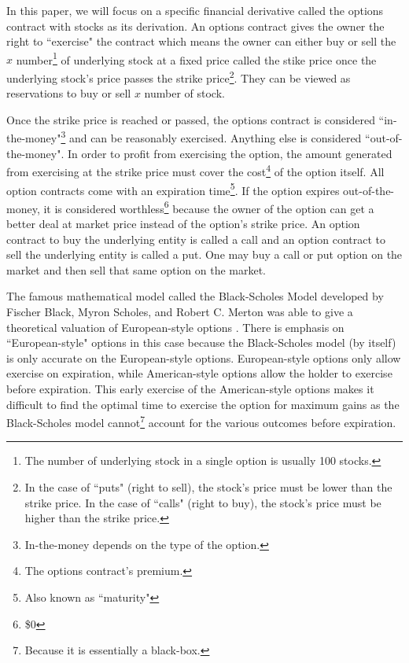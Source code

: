 \documentclass[12pt, letterpaper]{article}\usepackage{float}
\begin{document}
\medskip

In this paper, we will focus on a specific financial derivative called the options contract with stocks as its derivation.
An options contract gives the owner the right to ``exercise" the contract which means the owner can either buy or sell the ${x}$ number\footnote{The number of underlying stock in a single option is usually 100 stocks.} of underlying stock at a fixed price called the stike price once the underlying stock's price passes the strike price\footnote{In the case of ``puts" (right to sell), the stock's price must be lower than the strike price. In the case of ``calls" (right to buy), the stock's price must be higher than the strike price.\label{option rules}}.
They can be viewed as reservations to buy or sell ${x}$ number of stock.

\medskip

Once the strike price is reached or passed, the options contract is considered ``in-the-money"\footnote{In-the-money depends on the type of the option.} and can be reasonably exercised.
Anything else is considered ``out-of-the-money".
In order to profit from exercising the option, the amount generated from exercising at the strike price must cover the cost\footnote{The options contract's premium.} of the option itself.
All option contracts come with an expiration time\footnote{Also known as ``maturity"}.
If the option expires out-of-the-money, it is considered worthless\footnote{\$0} because the owner of the option can get a better deal at market price instead of the option's strike price.
An option contract to buy the underlying entity is called a call and an option contract to sell the underlying entity is called a put.
One may buy a call or put option on the market and then sell that same option on the market.

\medskip

The famous mathematical model called the Black-Scholes Model developed by Fischer Black, Myron Scholes, and Robert C. Merton was able to give a theoretical valuation of European-style options \cite{blackscholesmodelwikipedia}.
There is emphasis on ``European-style" options in this case because the Black-Scholes model (by itself) is only accurate on the European-style options.
European-style options only allow exercise on expiration, while American-style options allow the holder to exercise before expiration.
This early exercise of the American-style options makes it difficult to find the optimal time to exercise the option for maximum gains \cite{blackscholesmodelwikipedia} as the Black-Scholes model cannot\footnote{Because it is essentially a black-box.} account for the various outcomes before expiration. 
\end{document}
